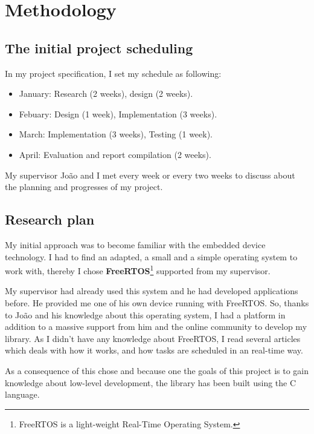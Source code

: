 \chapter{Methodology}

\section{The initial project scheduling}

\hspace{15mm}In my project specification, I set my schedule as following:
\begin{itemize}
\item January: Research (2 weeks), design (2 weeks).
\item Febuary: Design (1 week), Implementation (3 weeks).
\item March: Implementation (3 weeks), Testing (1 week).
\item April: Evaluation and report compilation (2 weeks).
\end{itemize}

My supervisor Jo\~{a}o and I met every week or every two weeks to discuss about the planning and progresses of my project. 


\section{Research plan}

\hspace{15mm}My initial approach was to become familiar with the embedded device technology. I had to find an adapted, a small and a simple operating system to work with, thereby I chose \textbf{FreeRTOS}\footnote{FreeRTOS is a light-weight Real-Time Operating System.} supported from my supervisor.

My supervisor had already used this system and he had developed applications before. He provided me one of his own device running with FreeRTOS. So, thanks to Jo\~{a}o and his knowledge about this operating system, I had a platform in addition to a massive support from him and the online community to develop my library. As I didn't have any knowledge about FreeRTOS, I read several articles which deals with how it works, and how tasks are scheduled in an real-time way.

As a consequence of this chose and because one the goals of this project is to gain knowledge about low-level development, the library has been built using the C language.

